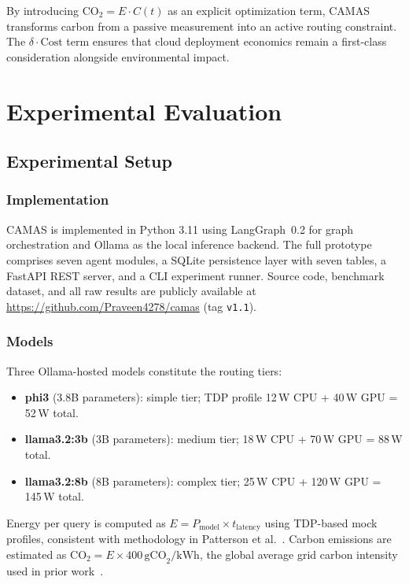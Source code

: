 \documentclass[journal]{IEEEtran}
\begin{document}
By introducing $\text{CO}_2 = E \cdot C(t)$ as an explicit optimization term,
CAMAS transforms carbon from a passive measurement into an active routing
constraint. The $\delta \cdot \text{Cost}$ term ensures that cloud deployment
economics remain a first-class consideration alongside environmental impact.

\section{Experimental Evaluation}

\subsection{Experimental Setup}

\subsubsection{Implementation}
CAMAS is implemented in Python 3.11 using LangGraph~0.2 for graph orchestration
and Ollama as the local inference backend. The full prototype comprises seven
agent modules, a SQLite persistence layer with seven tables, a FastAPI REST
server, and a CLI experiment runner. Source code, benchmark dataset, and all
raw results are publicly available at
\url{https://github.com/Praveen4278/camas} (tag \texttt{v1.1}).

\subsubsection{Models}
Three Ollama-hosted models constitute the routing tiers:
\begin{itemize}
    \item \textbf{phi3} (3.8B parameters): simple tier; TDP profile
          12\,W CPU + 40\,W GPU = 52\,W total.
    \item \textbf{llama3.2:3b} (3B parameters): medium tier;
          18\,W CPU + 70\,W GPU = 88\,W total.
    \item \textbf{llama3.2:8b} (8B parameters): complex tier;
          25\,W CPU + 120\,W GPU = 145\,W total.
\end{itemize}
Energy per query is computed as $E = P_{\text{model}} \times t_{\text{latency}}$
using TDP-based mock profiles, consistent with methodology in
Patterson et al.~\cite{patterson2021carbon}. Carbon emissions are estimated as
$\text{CO}_2 = E \times 400\,\text{gCO}_2\text{/kWh}$, the global average
grid carbon intensity used in prior work~\cite{kaufmann2023carbon}.
\end{document}
